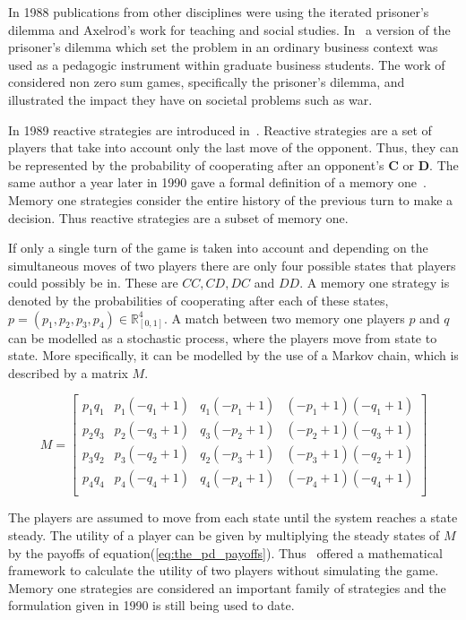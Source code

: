 \documentclass{article}
\theoremstyle{definition}
\begin{document}
In 1988 publications from other disciplines were using the iterated prisoner's
dilemma and Axelrod's work for teaching and social studies.
In~\cite{Levitt1988} a version of the prisoner's dilemma which set the
problem in an ordinary business context was used as a pedagogic instrument within
graduate business students. The work of~\cite{Rabow1988} considered non zero sum
games, specifically the prisoner's dilemma, and illustrated the impact they
have on societal problems such as war.

In 1989 reactive strategies are introduced in~\cite{nowak1989}. Reactive strategies
are a set of players that take into account only the last move of the opponent. 
Thus, they can be represented by the probability of cooperating after an opponent's
\textbf{C} or \textbf{D}. The same author a year later in 1990 gave a formal
definition of a memory one~\cite{Nowak1990}. Memory one strategies consider the
entire history of the previous turn to make a decision. Thus reactive strategies are
a subset of memory one.

If only a single turn of the game is taken into account and depending on the
simultaneous moves of two players there are only four possible states that
players could possibly be in. These are \(CC, CD, DC\) and \(DD\). A memory one
strategy is denoted by the probabilities of cooperating after each of these states,
\( p = (p_1, p_2, p_3, p_4) \in\mathbb{R}_{[0,1]}^{4} \).
A match between two memory one players \(p\) and \(q\) can be modelled as a
stochastic process, where the players move from state to state. More specifically,
it can be modelled by the use of a Markov chain, which is described by a matrix 
\(M\).

\begin{equation}\label{eq:markov_matrix}
    M =
\begin{bmatrix}
    p_{1} q_{1} & p_{1} (- q_{1} + 1) & q_{1} (- p_{1} + 1) & (- p_{1} + 1) (- q_{1} + 1)
    \\
    p_{2} q_{3} & p_{2} (- q_{3} + 1) & q_{3} (- p_{2} + 1) & (- p_{2} + 1) (- q_{3} + 1)
    \\
    p_{3} q_{2} & p_{3} (- q_{2} + 1) & q_{2} (- p_{3} + 1) & (- p_{3} + 1) (- q_{2} + 1)
    \\
    p_{4} q_{4} & p_{4} (- q_{4} + 1) & q_{4} (- p_{4} + 1) & (- p_{4} + 1) (- q_{4} + 1)
    \\
\end{bmatrix}
\end{equation}

The players are assumed to move from each state until the system reaches a state
steady.  The utility of a player can be given by multiplying the steady states of
\(M\) by the payoffs of equation(\ref{eq:the_pd_payoffs}). Thus~\cite{Nowak1990}
offered a mathematical framework to calculate the utility of two players without
simulating the game. Memory one strategies are considered an important family of
strategies and the formulation given in 1990 is still being used to date.
\end{document}
